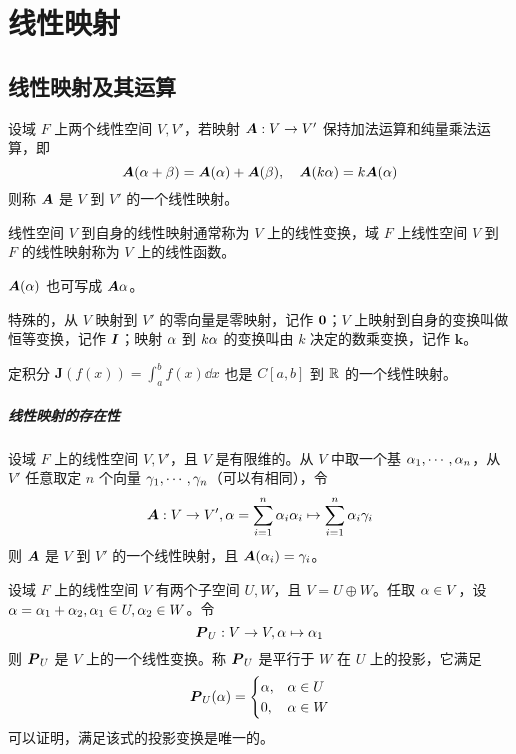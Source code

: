 \chapter{线性映射}

\section{线性映射及其运算}

\begin{definition}[线性映射]
    设域 $F$ 上两个线性空间 $V,V'$，若映射 $\boldsymbol{A} : V \to V'$ 保持加法运算和纯量乘法运算，即
    \[ \boldsymbol{A}(\alpha + \beta) = \boldsymbol{A}(\alpha) + \boldsymbol{A}(\beta), \quad \boldsymbol{A}(k\alpha) = k \boldsymbol{A}(\alpha) \]
    则称 $\boldsymbol{A}$ 是 $V$ 到 $V'$ 的一个线性映射。
\end{definition}

线性空间 $V$ 到自身的线性映射通常称为 $V$ 上的线性变换，域 $F$ 上线性空间 $V$ 到 $F$ 的线性映射称为 $V$ 上的线性函数。

$\boldsymbol{A}(\alpha)$ 也可写成 $\boldsymbol{A}\alpha$。

特殊的，从 $V$ 映射到 $V'$ 的零向量是零映射，记作 $\boldsymbol{0}$；$V$ 上映射到自身的变换叫做恒等变换，记作 $\boldsymbol{I}$；映射 $\alpha$ 到 $k\alpha$ 的变换叫由 $k$ 决定的数乘变换，记作 $\boldsymbol{k}$。

定积分 $\displaystyle \boldsymbol{J}(f(x)) = \int_a^b f(x) \dd x$ 也是 $C[a,b]$ 到 $\mathbb{R}$ 的一个线性映射。

\paragraph{线性映射的存在性}

\begin{theorem}
    设域 $F$ 上的线性空间 $V,V'$，且 $V$ 是有限维的。从 $V$ 中取一个基 $\alpha_1,\cdots,\alpha_n$，从 $V'$ 任意取定 $n$ 个向量 $\gamma_1,\cdots,\gamma_n$（可以有相同），令
    \[ \boldsymbol{A} : V \to V', \alpha = \sum_{i=1}^n \alpha_i\alpha_i \mapsto \sum_{i=1}^n \alpha_i\gamma_i \]
    则 $\boldsymbol{A}$ 是 $V$ 到 $V'$ 的一个线性映射，且 $\boldsymbol{A}(\alpha_i) = \gamma_i$。
\end{theorem}

设域 $F$ 上的线性空间 $V$ 有两个子空间 $U,W$，且 $V = U \oplus W$。任取 $\alpha \in V$，设 $\alpha = \alpha_1 + \alpha_2, \alpha_1 \in U, \alpha_2\in W$。令
\[ \boldsymbol{P}_U : V \to V, \alpha \mapsto \alpha_1 \]
则 $\boldsymbol{P}_U$ 是 $V$ 上的一个线性变换。称 $\boldsymbol{P}_U$ 是平行于 $W$ 在 $U$ 上的投影，它满足
\[ \boldsymbol{P}_U(\alpha) =
\begin{cases}
    \alpha,& \alpha \in U\\
    0 , & \alpha \in W
\end{cases} \]
可以证明，满足该式的投影变换是唯一的。

